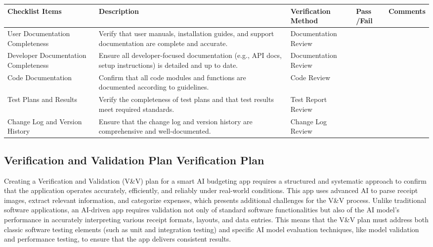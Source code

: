 \documentclass[12pt, titlepage]{article}
\begin{document}
\noindent \begin{tabular}{|>{\raggedright\arraybackslash}p{3cm}|>{\raggedright\arraybackslash}p{4cm}|>{\raggedright\arraybackslash}p{3cm}|p{1cm}|p{2.25cm}|}
	\hline
	\textbf{Checklist Items} & \textbf{Description} & \textbf{Verification Method} & \textbf{Pass /Fail} & \textbf{Comments} \\ 
	\hline
	User Documentation Completeness	& Verify that user manuals, installation guides, and support documentation are complete and accurate. & Documentation Review & & \\
	\hline
	Developer Documentation Completeness & Ensure all developer-focused documentation (e.g., API docs, setup instructions) is detailed and up to date. & Documentation Review & & \\ 
	\hline
	Code Documentation & Confirm that all code modules and functions are documented according to guidelines. & Code Review & & \\
	\hline
	Test Plans and Results & Verify the completeness of test plans and that test results meet required standards. & Test Report Review & & \\
	\hline
	Change Log and Version History & Ensure that the change log and version history are comprehensive and well-documented. & Change Log Review & & \\ 
	\hline
\end{tabular}

\subsection{Verification and Validation Plan Verification Plan}

Creating a Verification and Validation (V\&V) plan for a smart AI budgeting app requires a structured and systematic approach to confirm that the application operates accurately, efficiently, and reliably under real-world conditions.
This app uses advanced AI to parse receipt images, extract relevant information, and categorize expenses, which presents additional challenges for the V\&V process.
Unlike traditional software applications, an AI-driven app requires validation not only of standard software functionalities but also of the AI model's performance in accurately interpreting various receipt formats, layouts, and data entries.
This means that the V\&V plan must address both classic software testing elements (such as unit and integration testing) and specific AI model evaluation techniques, like model validation and performance testing, to ensure that the app delivers consistent results. \\
\end{document}
